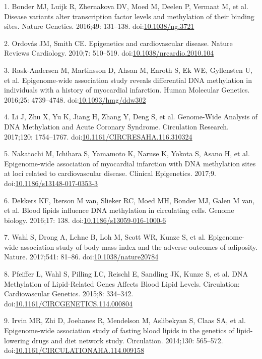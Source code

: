 \documentclass[]{article}
\theoremstyle{definition}
\theoremstyle{definition}
\theoremstyle{definition}
\theoremstyle{remark}
\begin{document}
1. Bonder MJ, Luijk R, Zhernakova DV, Moed M, Deelen P, Vermaat M, et
al. Disease variants alter transcription factor levels and methylation
of their binding sites. Nature Genetics. 2016;49: 131--138.
doi:\href{http://dx.doi.org/10.1038/ng.3721}{10.1038/ng.3721}

2. Ordov{á}s JM, Smith CE. Epigenetics and cardiovascular disease.
Nature Reviews Cardiology. 2010;7: 510--519.
doi:\href{http://dx.doi.org/10.1038/nrcardio.2010.104}{10.1038/nrcardio.2010.104}

3. Rask-Andersen M, Martinsson D, Ahsan M, Enroth S, Ek WE, Gyllensten
U, et al. Epigenome-wide association study reveals differential DNA
methylation in individuals with a history of myocardial infarction.
Human Molecular Genetics. 2016;25: 4739--4748.
doi:\href{http://dx.doi.org/10.1093/hmg/ddw302}{10.1093/hmg/ddw302}

4. Li J, Zhu X, Yu K, Jiang H, Zhang Y, Deng S, et al. Genome-Wide
Analysis of DNA Methylation and Acute Coronary Syndrome. Circulation
Research. 2017;120: 1754--1767.
doi:\href{http://dx.doi.org/10.1161/CIRCRESAHA.116.310324}{10.1161/CIRCRESAHA.116.310324}

5. Nakatochi M, Ichihara S, Yamamoto K, Naruse K, Yokota S, Asano H, et
al. Epigenome-wide association of myocardial infarction with DNA
methylation sites at loci related to cardiovascular disease. Clinical
Epigenetics. 2017;9.
doi:\href{http://dx.doi.org/10.1186/s13148-017-0353-3}{10.1186/s13148-017-0353-3}

6. Dekkers KF, Iterson M van, Slieker RC, Moed MH, Bonder MJ, Galen M
van, et al. Blood lipids influence DNA methylation in circulating cells.
Genome biology. 2016;17: 138.
doi:\href{http://dx.doi.org/10.1186/s13059-016-1000-6}{10.1186/s13059-016-1000-6}

7. Wahl S, Drong A, Lehne B, Loh M, Scott WR, Kunze S, et al.
Epigenome-wide association study of body mass index and the adverse
outcomes of adiposity. Nature. 2017;541: 81--86.
doi:\href{http://dx.doi.org/10.1038/nature20784}{10.1038/nature20784}

8. Pfeiffer L, Wahl S, Pilling LC, Reischl E, Sandling JK, Kunze S, et
al. DNA Methylation of Lipid-Related Genes Affects Blood Lipid Levels.
Circulation: Cardiovascular Genetics. 2015;8: 334--342.
doi:\href{http://dx.doi.org/10.1161/CIRCGENETICS.114.000804}{10.1161/CIRCGENETICS.114.000804}

9. Irvin MR, Zhi D, Joehanes R, Mendelson M, Aslibekyan S, Claas SA, et
al. Epigenome-wide association study of fasting blood lipids in the
genetics of lipid-lowering drugs and diet network study. Circulation.
2014;130: 565--572.
doi:\href{http://dx.doi.org/10.1161/CIRCULATIONAHA.114.009158}{10.1161/CIRCULATIONAHA.114.009158}
\end{document}
